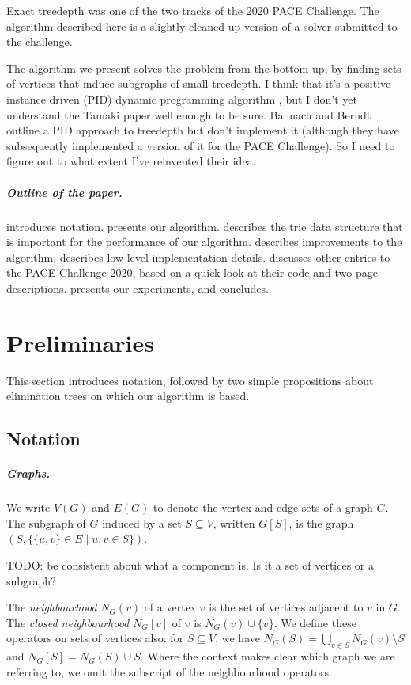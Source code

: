Exact treedepth was one of the two tracks of the 2020 PACE Challenge. The algorithm
described here is a slightly cleaned-up version of a solver submitted
to the challenge.

The algorithm we present solves the problem from the bottom up, by finding sets
of vertices that induce subgraphs of small treedepth.  I think that it's a positive-instance
driven (PID) dynamic programming algorithm \cite{DBLP:journals/jco/Tamaki19}, but I don't yet
understand the Tamaki paper well enough to be sure.  Bannach and Berndt \cite{DBLP:conf/wads/BannachB19}
outline a PID approach to treedepth but don't implement it (although they have subsequently
implemented a version of it for the PACE Challenge). So I need to figure out to what extent
I've reinvented their idea.

\subparagraph*{Outline of the paper.}   introduces notation.
 presents our algorithm.   describes the trie data structure
that is important for the performance of our algorithm.   describes
improvements to the algorithm.   describes low-level implementation details.
 discusses other entries to the PACE Challenge 2020, based on a quick
look at their code and two-page descriptions.   presents our experiments,
and  concludes.




\section{Preliminaries}\label{sec:preliminaries}

This section introduces notation, followed by two simple propositions about elimination trees
on which our algorithm is based.

\subsection{Notation}

\subparagraph*{Graphs.} We write $V(G)$ and $E(G)$ to denote the vertex and edge sets of a graph $G$.
The subgraph of $G$ induced by a set $S \subseteq V$, written $G[S]$, is the graph
$(S, \{\{u,v\} \in E \mid u,v \in S\})$.

TODO: be consistent about what a component is.  Is it a set of vertices or a subgraph?

The \emph{neighbourhood} $N_G(v)$ of a vertex $v$ is the set of vertices adjacent to $v$
in $G$.
The \emph{closed neighbourhood} $N_G[v]$ of $v$ is $N_G(v) \cup \{v\}$.
We define these operators on sets of vertices also:
for $S \subseteq V$, we have $N_G(S) = \bigcup_{v \in S}{N_G(v)} \setminus S$
and $N_G[S] = N_G(S) \cup S$.
Where the context makes clear which graph we are referring
to, we omit the subscript of the neighbourhood operators.


